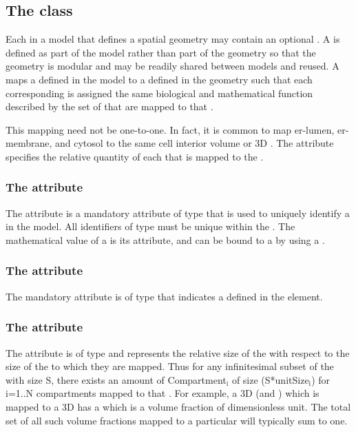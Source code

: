 \subsection{The  class}
\label{CompartmentMapping-class}
Each \Compartment in a model that defines a spatial geometry may contain an optional \CompartmentMapping. A \CompartmentMapping is defined as part of the model rather than part of the geometry so that the geometry is modular and may be readily shared between models and reused.  A \CompartmentMapping maps a \Compartment defined in the model to a \DomainType defined in the geometry such that each corresponding \DomainType is assigned the same biological and mathematical function described by the set of \Compartments that are mapped to that \DomainType. 

This mapping need not be one-to-one.  In fact, it is common to map er-lumen, er-membrane, and cytosol to the same cell interior volume or 3D \DomainType.  The  attribute specifies the relative quantity of each \Compartment that is mapped to the \DomainType.

\subsubsection{The  attribute}
The  attribute is a mandatory attribute of type  that is used to uniquely identify a \CompartmentMapping in the model.  All identifiers of type  must be unique within the \Geometry.  The mathematical value of a \CompartmentMapping is its  attribute, and can be bound to a \Parameter by using a \SpatialSymbolReference.

\subsubsection{The  attribute}
The mandatory  attribute is of type  that indicates a \DomainType defined in the \Geometry element.

\subsubsection{The  attribute}
The  attribute is of type  and represents the relative size of the \Compartment with respect to the size of the \Domains to which they are mapped.  Thus for any infinitesimal subset of the \Domain with size S, there exists an amount of Compartment$_{\text{i}}$ of size (S*unitSize$_{\text{i}}$) for i=1..N compartments mapped to that \DomainType.  For example, a 3D \Compartment (and \DomainType) which is mapped to a 3D \DomainType has a  which is a volume fraction of dimensionless unit.  The total set of all such volume fractions mapped to a particular \DomainType will typically sum to one. 

